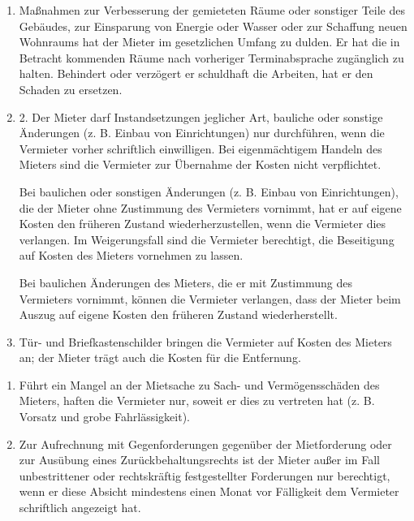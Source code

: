 \documentclass{scrreprt}[12pt,a4paper,twoside,duplex]
\begin{document}
\begin{contract}
	\begin{enumerate}
		\item Maßnahmen zur Verbesserung der gemieteten Räume oder sonstiger Teile des Gebäudes, zur Einsparung von Energie oder Wasser oder zur Schaffung neuen Wohnraums hat der Mieter im gesetzlichen Umfang zu dulden. Er hat die in Betracht kommenden Räume nach vorheriger Terminabsprache zugänglich zu halten. Behindert oder verzögert er schuldhaft die Arbeiten, hat er den Schaden zu ersetzen.
		\item     2. Der Mieter darf Instandsetzungen jeglicher Art, bauliche oder sonstige Änderungen (z. B. Einbau von Einrichtungen) nur durchführen, wenn die Vermieter vorher schriftlich einwilligen. Bei eigenmächtigem Handeln des Mieters sind die Vermieter zur Übernahme der Kosten nicht verpflichtet.

		Bei baulichen oder sonstigen Änderungen (z. B. Einbau von Einrichtungen), die der Mieter ohne Zustimmung des Vermieters vornimmt, hat er auf eigene Kosten den früheren Zustand wiederherzustellen, wenn die Vermieter dies verlangen. Im Weigerungsfall sind die Vermieter berechtigt, die Beseitigung auf Kosten des Mieters vornehmen zu lassen.

		Bei baulichen Änderungen des Mieters, die er mit Zustimmung des Vermieters vornimmt, können die Vermieter verlangen, dass der Mieter beim Auszug auf eigene Kosten den früheren Zustand wiederherstellt.
		\item Tür- und Briefkastenschilder bringen die Vermieter auf Kosten des Mieters an; der Mieter trägt auch die Kosten für die Entfernung.
	\end{enumerate}
\end{contract}

\begin{contract}
	\begin{enumerate}
		\item Führt ein Mangel an der Mietsache zu Sach- und Vermögensschäden des Mieters, haften die Vermieter nur, soweit er dies zu vertreten hat (z. B. Vorsatz und grobe Fahrlässigkeit).
		\item Zur Aufrechnung mit Gegenforderungen gegenüber der Mietforderung oder zur Ausübung eines Zurückbehaltungsrechts ist der Mieter außer im Fall unbestrittener oder rechtskräftig festgestellter Forderungen nur berechtigt, wenn er diese Absicht mindestens einen Monat vor Fälligkeit dem Vermieter schriftlich angezeigt hat.
	\end{enumerate}
\end{contract}
\end{document}
